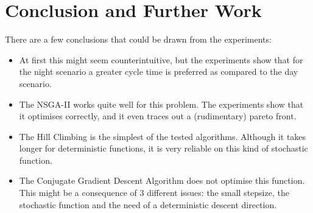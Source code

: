 \documentclass[./\jobname.tex]{subfiles}
\begin{document}
\begin{table}[h]
	\centering
	\noindent{}
	\label{tab:day_sensetivity}
\end{table}


\chapter{Conclusion and Further Work}

There are a few conclusions that could be drawn from the experiments: 

\begin{itemize}
	\item At first this might seem counterintuitive, but the experiments show that for the night scenario a greater cycle time is preferred as compared to the day scenario. 
	\item The NSGA-II works quite well for this problem. The experiments show that it optimises correctly, and it even traces out a (rudimentary) pareto front. 
	\item The Hill Climbing is the simplest of the tested algorithms. Although it takes longer for deterministic functions, it is very reliable on this kind of stochastic function. 
	\item The Conjugate Gradient Descent Algorithm does not optimise this function. This might be a consequence of 3 different issues: the small stepsize, the stochastic function and the need of a deterministic descent direction. 
	
\end{itemize}
\end{document}
